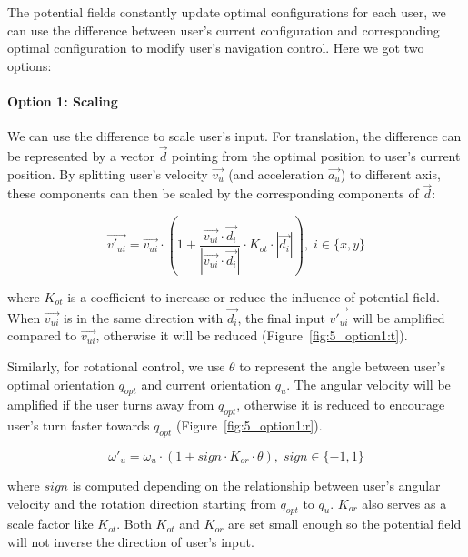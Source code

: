 The potential fields constantly update optimal configurations for each user, we can use the difference between user's current configuration and corresponding optimal configuration to modify user's navigation control. Here we got two options:

\paragraph{Option 1: Scaling}
We can use the difference to scale user's input. For translation, the difference can be represented by a vector $\overrightarrow{d}$ pointing from the optimal position to user's current position. By splitting user's velocity $\overrightarrow{v_{u}}$ (and acceleration $\overrightarrow{a_{u}}$) to different axis, these components can then be scaled by the corresponding components of $\overrightarrow{d}$:   

\begin{equation}
\label{eq:option1_t}
\overrightarrow{v'_{ui}}=\overrightarrow{v_{ui}} \cdot (1+\frac{\overrightarrow{v_{ui}} \cdot \overrightarrow{d_{i}}}{|\overrightarrow{v_{ui}} \cdot \overrightarrow{d_{i}}|} \cdot K_{ot} \cdot |\overrightarrow{d_{i}}|), \;i\in\{x ,y\}
\end{equation}

where $K_{ot}$ is a coefficient to increase or reduce the influence of potential field. When $\overrightarrow{v_{ui}}$ is in the same direction with $\overrightarrow{d_{i}}$, the final input $\overrightarrow{v'_{ui}}$ will be amplified compared to $\overrightarrow{v_{ui}}$, otherwise it will be reduced (Figure~\ref{fig:5_option1:t}).

Similarly, for rotational control, we use $\theta$ to represent the angle between user's optimal orientation $q_{opt}$ and current orientation $q_{u}$. The angular velocity will be amplified if the user turns away from $q_{opt}$, otherwise it is reduced to encourage user's turn faster towards $q_{opt}$ (Figure~\ref{fig:5_option1:r}).

\begin{equation}
\label{eq:option1_r}
\omega'_{u}=\omega_{u} \cdot (1+sign \cdot K_{or} \cdot \theta),\;sign \in \{-1, 1\} 
\end{equation}

where $sign$ is computed depending on the relationship between user's angular velocity and the rotation direction starting from $q_{opt}$ to $q_{u}$. $K_{or}$ also serves as a scale factor like $K_{ot}$. Both $K_{ot}$ and $K_{or}$ are set small enough so the potential field will not inverse the direction of user's input.

